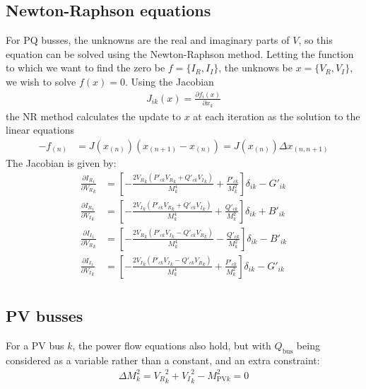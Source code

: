 \documentclass[11pt]{article}
\newcommand{\re}[1]{{{#1}_R}}
\newcommand{\im}[1]{{{#1}_I}}
\begin{document}
\subsection{Newton-Raphson equations}
For PQ busses, the unknowns are the real and imaginary parts of $V$, so this equation can be solved using the Newton-Raphson method. Letting the function to which we want to find the zero be $f = \{\re{I}, \im{I}\}$, the unknows be $x = \{\re{V}, \im{V}\}$, we wish to solve $f(x) = 0$. Using the Jacobian
\begin{align}
J_{ik}(x) = \frac{\partial f_i(x)}{\partial x_k}
\end{align}
the NR method calculates the update to $x$ at each iteration as the solution to the linear equations
\begin{align}
-f_{(n)} &= J(x_{(n)})(x_{(n+1)}-x_{(n)}) = J(x_{(n)})\Delta x_{(n,n+1)}
\end{align}
The Jacobian is given by:
\begin{align}
\frac{\partial \re{I}_i}{\partial \re{V}_{k}} &= \left[-\frac{2\re{V}_k(P'_{ck}\re{V}_k + Q'_{ck}\im{V}_k)}{M_k^4} + \frac{P'_{ck}}{M_k^2} \right]\delta_{ik} - G'_{ik} \\
\frac{\partial \re{I}_i}{\partial \im{V}_{k}} &= \left[-\frac{2\im{V}_k(P'_{ck}\re{V}_k + Q'_{ck}\im{V}_k)}{M_k^4} + \frac{Q'_{ck}}{M_k^2} \right]\delta_{ik}  + B'_{ik} \\
\frac{\partial \im{I}_i}{\partial \re{V}_{k}} &= \left[-\frac{2\re{V}_k(P'_{ck}\im{V}_k - Q'_{ck}\re{V}_k)}{M_k^4} - \frac{Q'_{ck}}{M_k^2} \right]\delta_{ik}  - B'_{ik} \\
\frac{\partial \im{I}_i}{\partial \im{V}_{k}} &= \left[-\frac{2\im{V}_k(P'_{ck}\im{V}_k - Q'_{ck}\re{V}_k)}{M_k^4} + \frac{P'_{ck}}{M_k^2} \right] \delta_{ik} - G'_{ik} \\
\end{align}

\subsection{PV busses}
For a PV bus $k$, the power flow equations also hold, but with $Q_{\text{bus}}$ being considered as a variable rather than a constant, and an extra constraint:
\begin{align}
\Delta M^2_k = \re{V}_{k}^2 + \im{V}_k^2 - M^2_{\text{PV}k} = 0
\end{align}
\end{document}
